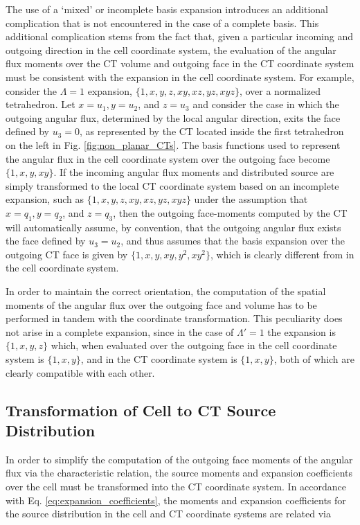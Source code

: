 The use of a `mixed' or incomplete basis expansion introduces an additional complication that is not encountered in the case of a complete basis.
This additional complication stems from the fact that, given a particular incoming and outgoing direction in the cell coordinate system, the evaluation of the angular flux moments over the \ac{CT} volume and outgoing face in the \ac{CT} coordinate system must be consistent with the expansion in the cell coordinate system.
For example, consider the $\Lambda = 1$ expansion, $\{1, x, y, z, xy, xz, yz, xyz \}$, over a normalized tetrahedron.
Let $x = u_1, y = u_2$, and $z = u_3$ and consider the case in which the outgoing angular flux, determined by the local angular direction, exits the face defined by $u_3 = 0$, as represented by the \ac{CT} located inside the first tetrahedron on the left in Fig. \ref{fig:non_planar_CTs}.
The basis functions used to represent the angular flux in the cell coordinate system over the outgoing face become $\{ 1, x, y, xy \}$.
If the incoming angular flux moments and distributed source are simply transformed to the local \ac{CT} coordinate system based on an incomplete expansion, such as $\{ 1, x, y, z, xy, xz, yz, xyz \}$ under the assumption that $x = q_1, y = q_2$, and $z = q_3$, then the outgoing face-moments computed by the \ac{CT} will automatically assume, by convention, that the outgoing angular flux exists the face defined by $u_3 = u_2$, and thus assumes that the basis expansion over the outgoing \ac{CT} face is given by $\{ 1, x, y, xy, y^2, xy^2 \}$, which is clearly different from in the cell coordinate system.

In order to maintain the correct orientation, the computation of the spatial moments of the angular flux over the outgoing face and volume has to be  performed in tandem with the coordinate transformation.
This peculiarity does not arise in a complete expansion, since in the case of $\Lambda ' = 1$ the expansion is $\{ 1, x, y, z \}$ which, when evaluated over the outgoing face in the cell coordinate system is $\{ 1, x, y \}$, and in the \ac{CT} coordinate system is $\{ 1, x, y \}$, both of which are clearly compatible with each other.

\subsection{Transformation of Cell to \ac{CT} Source Distribution}

In order to simplify the computation of the outgoing face moments of the angular flux via the characteristic relation, the source moments and expansion coefficients over the cell must be transformed into the \ac{CT} coordinate system.
In accordance with Eq. \ref{eq:expansion_coefficients}, the moments and expansion coefficients for the source distribution in the cell and \ac{CT} coordinate systems are related via

